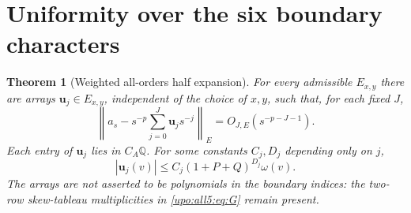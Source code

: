 \documentclass[11pt,letterpaper]{article}
\newtheorem{theorem}{Theorem}[section]
\theoremstyle{remark}\newtheorem{remark}[theorem]{Remark}
\numberwithin{equation}{section}
\newcommand{\bfU}{\boldsymbol u}
\begin{document}
\section{Uniformity over the six boundary characters}\label{upo:all5:sec:weighted}
\begin{theorem}[Weighted all-orders half expansion]\label{upo:all5:thm:half}
For every admissible $E_{x,y}$ there are arrays $\bfU_j\in E_{x,y}$,
independent of the choice of $x,y$, such that, for each fixed $J$,
\begin{equation}\label{upo:all5:eq:half-all}
 \left\|a_s-s^{-p}\sum_{j=0}^J\bfU_j s^{-j}\right\|_E
                      =O_{J,E}(s^{-p-J-1}).
\end{equation}
Each entry of $\bfU_j$ lies in $C_A\mathbb Q$. For some constants
$C_j,D_j$ depending only on $j$,
\begin{equation}\label{upo:all5:eq:coeffbound}
 |\bfU_j(v)|\le C_j(1+P+Q)^{D_j}\omega(v).
\end{equation}
The arrays are not asserted to be polynomials in the boundary indices:
the two-row skew-tableau multiplicities in \eqref{upo:all5:eq:G} remain present.
\end{theorem}
\end{document}
